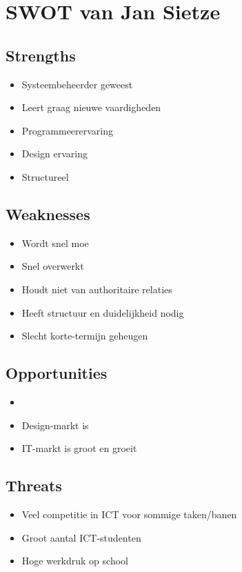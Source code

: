 \documentclass[11pt,oneside,a4paper,numbers=enddot]{report} %
\begin{document}
\section{SWOT van Jan Sietze}

\subsection{Strengths}

\begin{itemize}
\item
  Systeembeheerder geweest
\item
  Leert graag nieuwe vaardigheden
\item
  Programmeerervaring
\item
  Design ervaring
\item
  Structureel
\end{itemize}

\subsection{Weaknesses}

\begin{itemize}
\item
  Wordt snel moe
\item
  Snel overwerkt
\item
  Houdt niet van authoritaire relaties
\item
  Heeft structuur en duidelijkheid nodig
\item
  Slecht korte-termijn geheugen
\end{itemize}

\subsection{Opportunities}

\begin{itemize}
\item
  
\item
  Design-markt is 
\item
  IT-markt is groot en groeit
\end{itemize}

\subsection{Threats}

\begin{itemize}
\item
  Veel competitie in ICT voor sommige taken/banen
\item
  Groot aantal ICT-studenten
\item
  Hoge werkdruk op school
\end{itemize}
\end{document}
